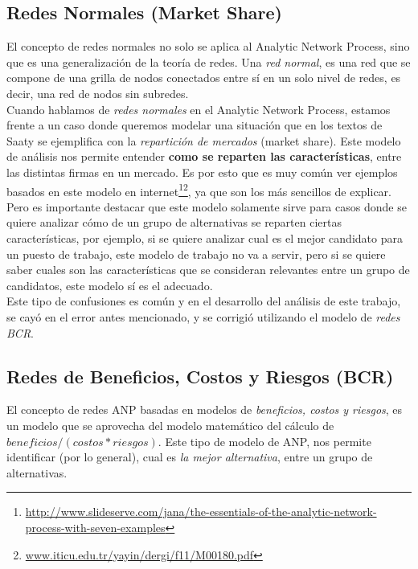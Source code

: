 \documentclass[12pt,letterpaper]{article}
\begin{document}
\subsection{Redes Normales (Market Share)}
El concepto de redes normales no solo se aplica al Analytic Network Process, sino que es una generalización de la teoría de redes. Una \textit{red normal}, es una red que se compone de una grilla de nodos conectados entre sí en un solo nivel de redes, es decir, una red de nodos sin subredes.\\

Cuando hablamos de \textit{redes normales} en el Analytic Network Process, estamos frente a un caso donde queremos modelar una situación que en los textos de Saaty se ejemplifica con la \textit{repartición de mercados} (market share). Este modelo de análisis nos permite entender \textbf{como se reparten las características}, entre las distintas firmas en un mercado. Es por esto que es muy común ver ejemplos basados en este modelo en internet\footnote{\url{http://www.slideserve.com/jana/the-essentials-of-the-analytic-network-process-with-seven-examples}}\footnote{\url{www.iticu.edu.tr/yayin/dergi/f11/M00180.pdf}}, ya que son los más sencillos de explicar. Pero es importante destacar que este modelo solamente sirve para casos donde se quiere analizar cómo de un grupo de alternativas se reparten ciertas características, por ejemplo, si se quiere analizar cual es el mejor candidato para un puesto de trabajo, este modelo de trabajo no va a servir, pero si se quiere saber cuales son las características que se consideran relevantes entre un grupo de candidatos, este modelo sí es el adecuado.\\
Este tipo de confusiones es común y en el desarrollo del análisis de este trabajo, se cayó en el error antes mencionado, y se corrigió utilizando el modelo de \textit{redes BCR}.

\subsection{Redes de  Beneficios, Costos y Riesgos (BCR)}
El concepto de redes ANP basadas en modelos de \textit{beneficios, costos y riesgos}, es un modelo que se aprovecha del modelo matemático del cálculo de $beneficios / (costos * riesgos)$. Este tipo de modelo de ANP, nos permite identificar (por lo general), cual es \textit{la mejor alternativa}, entre un grupo de alternativas.\\
\end{document}
